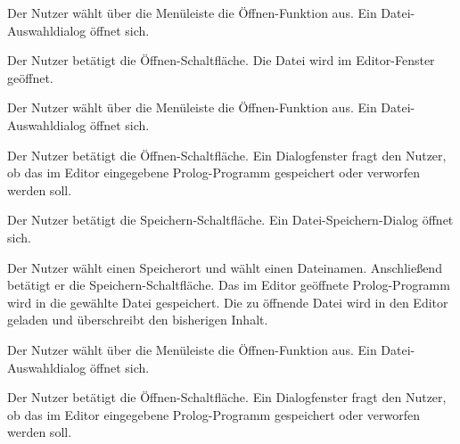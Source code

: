 \documentclass[parskip=full,11pt,twoside]{scrartcl}
\begin{document}
{Der Nutzer wählt über die Menüleiste die Öffnen-Funktion aus.}
{Ein Datei-Auswahldialog öffnet sich.}

{Der Nutzer betätigt die Öffnen-Schaltfläche.}
{Die Datei wird im Editor-Fenster geöffnet.}



{Der Nutzer wählt über die Menüleiste die Öffnen-Funktion aus.}
{Ein Datei-Auswahldialog öffnet sich.}

{Der Nutzer betätigt die Öffnen-Schaltfläche.}
{Ein Dialogfenster fragt den Nutzer, ob das im Editor eingegebene Prolog-Programm gespeichert oder verworfen werden soll.}

{Der Nutzer betätigt die Speichern-Schaltfläche.}
{Ein Datei-Speichern-Dialog öffnet sich.}

{Der Nutzer wählt einen Speicherort und wählt einen Dateinamen. Anschließend betätigt er die Speichern-Schaltfläche.}
{Das im Editor geöffnete Prolog-Programm wird in die gewählte Datei gespeichert. Die zu öffnende Datei wird in den Editor geladen und überschreibt den bisherigen Inhalt.}



{Der Nutzer wählt über die Menüleiste die Öffnen-Funktion aus.}
{Ein Datei-Auswahldialog öffnet sich.}

{Der Nutzer betätigt die Öffnen-Schaltfläche.}
{Ein Dialogfenster fragt den Nutzer, ob das im Editor eingegebene Prolog-Programm gespeichert oder verworfen werden soll.}
\end{document}
